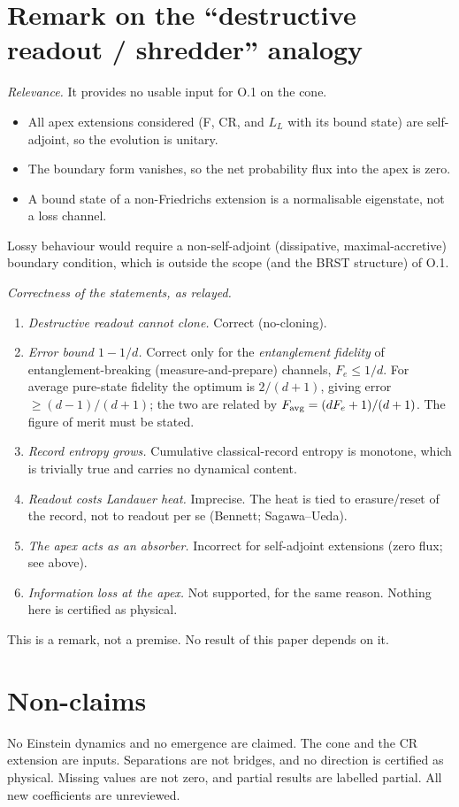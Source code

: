 \appendix
\section{Remark on the ``destructive readout / shredder'' analogy}
\emph{Relevance.} It provides no usable input for O.1 on the cone.
\begin{itemize}
\item All apex extensions considered (F, CR, and $L_L$ with its bound state) are self-adjoint, so the evolution is unitary.
\item The boundary form vanishes, so the net probability flux into the apex is zero.
\item A bound state of a non-Friedrichs extension is a normalisable eigenstate, not a loss channel.
\end{itemize}
Lossy behaviour would require a non-self-adjoint (dissipative, maximal-accretive) boundary condition, which is outside the scope (and the BRST structure) of O.1.

\emph{Correctness of the statements, as relayed.}
\begin{enumerate}
\item \emph{Destructive readout cannot clone.} Correct (no-cloning).
\item \emph{Error bound $1-1/d$.} Correct only for the \emph{entanglement fidelity} of entanglement-breaking (measure-and-prepare) channels, $F_e\le1/d$. For average pure-state fidelity the optimum is $2/(d+1)$, giving error $\ge(d-1)/(d+1)$; the two are related by $F_{\rm avg}=(dF_e+1)/(d+1)$. The figure of merit must be stated.
\item \emph{Record entropy grows.} Cumulative classical-record entropy is monotone, which is trivially true and carries no dynamical content.
\item \emph{Readout costs Landauer heat.} Imprecise. The heat is tied to erasure/reset of the record, not to readout per se (Bennett; Sagawa--Ueda).
\item \emph{The apex acts as an absorber.} Incorrect for self-adjoint extensions (zero flux; see above).
\item \emph{Information loss at the apex.} Not supported, for the same reason. Nothing here is certified as physical.
\end{enumerate}
This is a remark, not a premise. No result of this paper depends on it.

\section*{Non-claims}
No Einstein dynamics and no emergence are claimed. The cone and the CR extension are inputs. Separations are not bridges, and no direction is certified as physical. Missing values are not zero, and partial results are labelled partial. All new coefficients are unreviewed.

